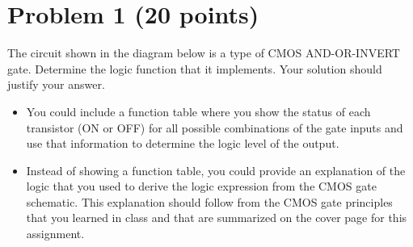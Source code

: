 \documentclass{article}
\begin{document}
\section*{Problem 1 (20 points)}
The circuit shown in the diagram below is a type of CMOS AND-OR-INVERT gate. Determine the logic function that it implements. Your solution should justify your answer.
\begin{itemize}
    \item You  could  include  a  function  table  where  you show  the  status  of  each  transistor  (ON  or  OFF)  for  all possible  combinations  of  the  gate  inputs  and use  that  information to determine  the  logic  level of  the output.
    \item Instead of showing a function table, you could provide an explanation of the logic that you used to derive the logic expression from the CMOS gate schematic. This explanation should follow from the CMOS gate principles that you learned in class and that are summarized on the cover page for this assignment.
\end{itemize}
\begin{center}
\end{center}
\end{document}
